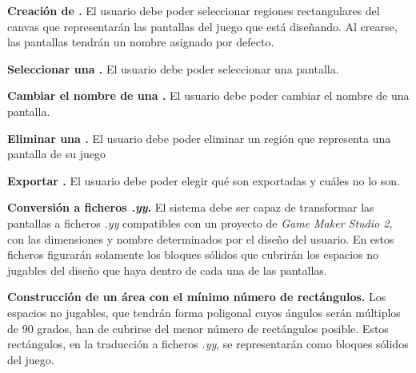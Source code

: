 	\item \textbf{Creación de .}\newline
		El usuario debe poder seleccionar regiones rectangulares del canvas que representarán las pantallas del juego que está diseñando. Al crearse, las pantallas tendrán un nombre asignado por defecto.
	\item \textbf{Seleccionar una .}\newline
		El usuario debe poder seleccionar una pantalla.
	\item \textbf{Cambiar el nombre de una .}\newline
		El usuario debe poder cambiar el nombre de una pantalla.
	\item \textbf{Eliminar una .}\newline
		El usuario debe poder eliminar un región que representa una pantalla de su juego
	\item \textbf{Exportar .}\newline
		El usuario debe poder elegir qué  son exportadas y cuáles no lo son.
	\item\label{PARTICULAR:REQUISITO31} \textbf{Conversión a ficheros \textit{.yy}.}\newline
		El sistema debe ser capaz de transformar las pantallas a ficheros \textit{.yy} compatibles con un proyecto de \textit{Game Maker Studio 2}, con las dimensiones y nombre determinados por el diseño del usuario. En estos ficheros figurarán solamente los bloques sólidos que cubrirán los espacios no jugables del diseño que haya dentro de cada una de las pantallas.
		\begin{functional}
			\item \textbf{Construcción de un área con el mínimo número de rectángulos.}\newline
				Los espacios no jugables, que tendrán forma poligonal cuyos ángulos serán múltiplos de 90 grados, han de cubrirse del menor número de rectángulos posible. Estos rectángulos, en la traducción a ficheros \textit{.yy}, se representarán como bloques sólidos del juego.
		\end{functional}
